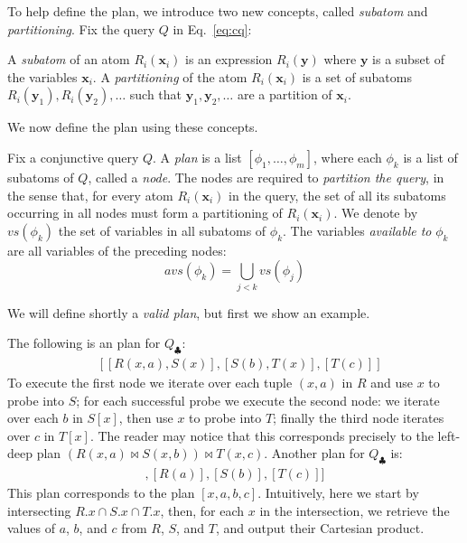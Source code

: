 To help define the \FJ plan, we introduce two new concepts, called
\emph{subatom} and \emph{partitioning}.  Fix the query $Q$ in
Eq.~\eqref{eq:cq}:

\begin{definition}
  A \emph{subatom} of an atom $R_i(\bm x_i)$ is an expression
  $R_i(\bm y)$ where $\bm y$ is a subset of the variables $\bm x_i$.
  A \emph{partitioning} of the atom $R_i(\bm x_i)$ is a set of
  subatoms $R_i(\bm y_1), R_i(\bm y_2), \ldots$ such that
  $\bm y_1, \bm y_2, \ldots$ are a partition of $\bm x_i$.
\end{definition}

We now define the \FJ plan using these concepts.

\begin{definition}[\FJ Plan]
  Fix a conjunctive query $Q$.  A \FJ \emph{plan} is a list
  $[\phi_1, \ldots, \phi_m]$, where each $\phi_k$ is a list of
  subatoms of $Q$, called a {\em node}.  The nodes are required to
    {\em partition the query}, in the sense that, for every atom
  $R_i(\bm x_i)$ in the query, the set of all its subatoms occurring
  in all nodes must form a partitioning of $R_i(\bm x_i)$.  We denote
  by $vs(\phi_k)$ the set of variables in all subatoms of $\phi_k$.
  The variables \emph{available to} $\phi_k$ are all variables of the
  preceding nodes:
  $$avs(\phi_k) = \bigcup_{j < k} vs(\phi_j)$$
\end{definition}


We will define shortly a {\em valid plan}, but first we show an example.



\begin{example}\label{ex:fj-plan}
  The following is an \FJ plan for $Q_\clubsuit$:
  \begin{align}
     & [[R(x, a), S(x)], [S(b), T(x)], [T(c)]]\label{eq:bj-plan}
  \end{align}
  To execute the first node we iterate over each tuple $(x, a)$ in $R$
  and use $x$ to probe into $S$; for each successful probe we execute
  the second node: we iterate over each $b$ in $S[x]$, then use
  $x$ to probe into $T$; finally the third node iterates over $c$ in
  $T[x]$.  The reader may notice that this corresponds precisely to the
  left-deep plan $(R(x,a) \Join S(x,b))\Join T(x,c)$.
  Another \FJ plan for $Q_\clubsuit$ is:
  \begin{align}
    [[R(x), S(x), T(x)], [R(a)], [S(b)], [T(c)]]\label{eq:gj-plan}
  \end{align}
  This plan corresponds to the \GJ plan $[x,a,b,c]$.  Intuitively, here
  we start by intersecting $R.x \cap S.x \cap T.x$, then, for each $x$
  in the intersection, we retrieve the values of $a$, $b$, and $c$ from
  $R$, $S$, and $T$, and output their Cartesian product.
\end{example}

